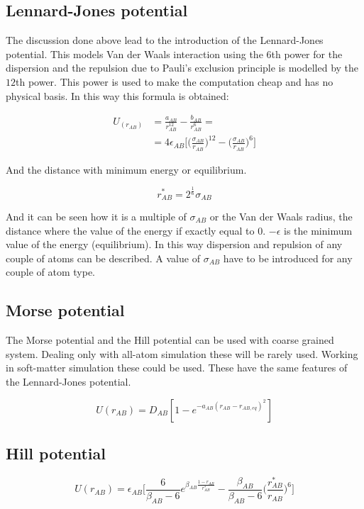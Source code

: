 	\subsection{Lennard-Jones potential}
	The discussion done above lead to the introduction of the Lennard-Jones potential.
	This models Van der Waals interaction using the $6$th power for the dispersion and the repulsion due to Pauli's exclusion principle is modelled by the $12$th power.
	This power is used to make the computation cheap and has no physical basis.
	In this way this formula is obtained:

	\begin{align*}
		U_(r_{AB}) &= \frac{a_{AB}}{r^{12}_{AB}}-\frac{b_{AB}}{r^6_{AB}}=\\
							 &= 4\epsilon_{AB}\biggl[\biggl(\frac{\sigma_{AB}}{r_{AB}}\biggr)^{12}-\biggl(\frac{\sigma_{AB}}{r_{AB}}\biggr)^6\biggr]
	\end{align*}

	And the distance with minimum energy or equilibrium.

	$$r^*_{AB} = 2^{\frac{1}{6}}\sigma_{AB}$$

	And it can be seen how it is a multiple of $\sigma_{AB}$ or the Van der Waals radius, the distance where the value of the energy if exactly equal to $0$.
	$-\epsilon$ is the minimum value of the energy (equilibrium).
	In this way dispersion and repulsion of any couple of atoms can be described.
	A value of $\sigma_{AB}$ have to be introduced for any couple of atom type.

	\subsection{Morse potential}
	The Morse potential and the Hill potential can be used with coarse grained system.
	Dealing only with all-atom simulation these will be rarely used.
	Working in soft-matter simulation these could be used.
	These have the same features of the Lennard-Jones potential.

	$$U(r_{AB}) = D_{AB}[1-e^{-a_{AB}(r_{AB}-r_{AB,eq})^2}]$$

	\subsection{Hill potential}

	$$U(r_{AB}) = \epsilon_{AB}\biggl[\frac{6}{\beta_{AB}-6}e^{\beta_{AB}\frac{1-r_{AB}}{r^*_{AB}}}-\frac{\beta_{AB}}{\beta_{AB}-6}\biggl(\frac{r^*_{AB}}{r_{AB}}\biggr)^6\biggr]$$

